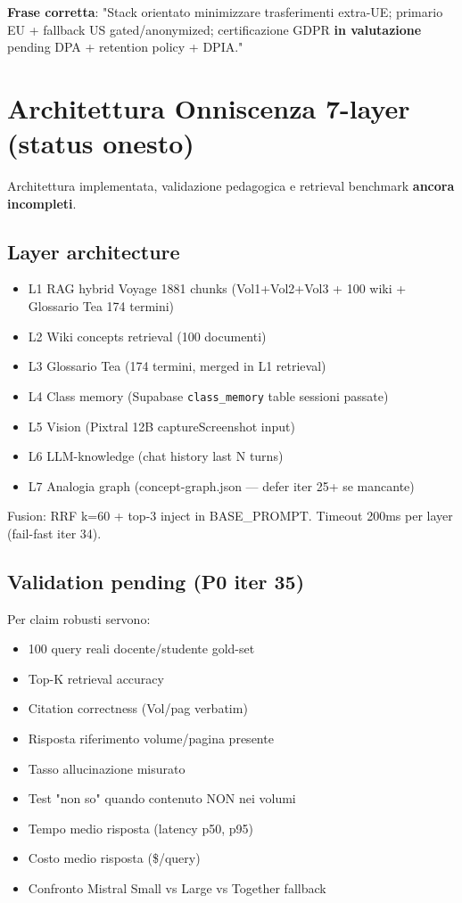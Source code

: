 \documentclass[12pt,a4paper]{article}
\begin{document}
\textbf{Frase corretta}: "Stack orientato minimizzare trasferimenti extra-UE; primario EU + fallback US gated/anonymized; certificazione GDPR \textbf{in valutazione} pending DPA + retention policy + DPIA."

\section{Architettura Onniscenza 7-layer (status onesto)}

Architettura implementata, validazione pedagogica e retrieval benchmark \textbf{ancora incompleti}.

\subsection*{Layer architecture}

\begin{itemize}[leftmargin=*]
  \item L1 RAG hybrid Voyage 1881 chunks (Vol1+Vol2+Vol3 + 100 wiki + Glossario Tea 174 termini)
  \item L2 Wiki concepts retrieval (100 documenti)
  \item L3 Glossario Tea (174 termini, merged in L1 retrieval)
  \item L4 Class memory (Supabase \texttt{class\_memory} table sessioni passate)
  \item L5 Vision (Pixtral 12B captureScreenshot input)
  \item L6 LLM-knowledge (chat history last N turns)
  \item L7 Analogia graph (concept-graph.json --- defer iter 25+ se mancante)
\end{itemize}

Fusion: RRF k=60 + top-3 inject in BASE\_PROMPT. Timeout 200ms per layer (fail-fast iter 34).

\subsection*{Validation pending (P0 iter 35)}

Per claim robusti servono:
\begin{itemize}[leftmargin=*]
  \item 100 query reali docente/studente gold-set
  \item Top-K retrieval accuracy
  \item Citation correctness (Vol/pag verbatim)
  \item Risposta riferimento volume/pagina presente
  \item Tasso allucinazione misurato
  \item Test "non so" quando contenuto NON nei volumi
  \item Tempo medio risposta (latency p50, p95)
  \item Costo medio risposta (\$/query)
  \item Confronto Mistral Small vs Large vs Together fallback
\end{itemize}
\end{document}
